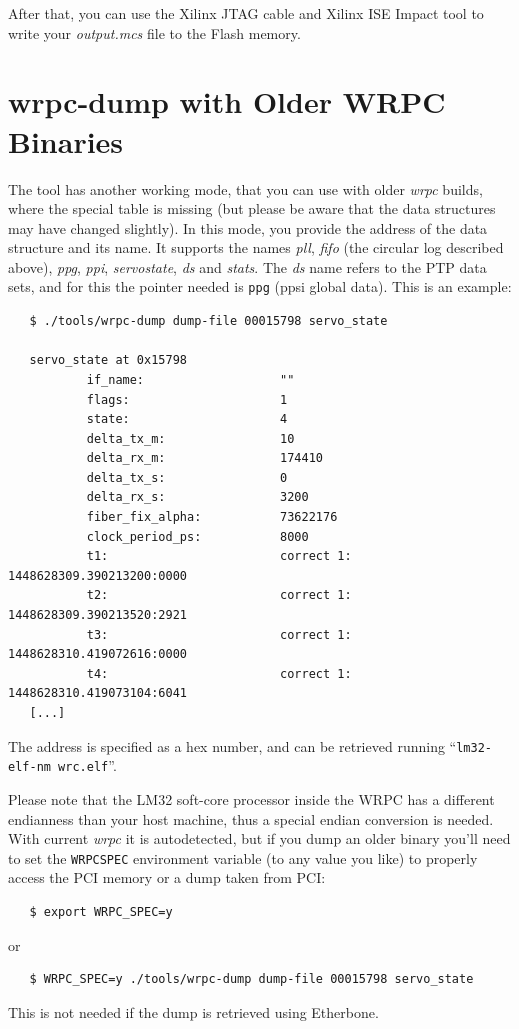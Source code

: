 \documentclass[a4paper, 12pt]{article}
\renewcommand{\_}{\underscore\allowbreak}
\begin{document}
After that, you can use the Xilinx JTAG cable and Xilinx ISE Impact tool to
write your \textit{output.mcs} file to the Flash memory.
\newpage
\section{wrpc-dump with Older WRPC Binaries}
\label{wrpc-dump with Older WRPC Binaries}

The tool has another working mode, that you can use with older
\textit{wrpc} builds, where the special table is missing (but please be
aware that the data structures may have changed slightly).  In this
mode, you provide the address of the data structure and its name. It
supports the names \textit{pll}, \textit{fifo} (the circular log described
above), \textit{ppg}, \textit{ppi}, \textit{servo\_state}, \textit{ds} and
\textit{stats}. The \textit{ds} name
refers to the PTP data sets, and for this the pointer needed is
\texttt{ppg} (ppsi global data).
This is an example:

\begin{lstlisting}
   $ ./tools/wrpc-dump dump-file 00015798 servo_state

   servo_state at 0x15798
           if_name:                   ""
           flags:                     1
           state:                     4
           delta_tx_m:                10
           delta_rx_m:                174410
           delta_tx_s:                0
           delta_rx_s:                3200
           fiber_fix_alpha:           73622176
           clock_period_ps:           8000
           t1:                        correct 1: 1448628309.390213200:0000
           t2:                        correct 1: 1448628309.390213520:2921
           t3:                        correct 1: 1448628310.419072616:0000
           t4:                        correct 1: 1448628310.419073104:6041
   [...]
\end{lstlisting}

The address is specified as a hex number, and can be retrieved running
``\texttt{lm32-elf-nm  wrc.elf}''.

Please note that the LM32 soft-core processor inside the WRPC has a different
endianness than your host machine, thus a special endian conversion is needed.
With current \textit{wrpc} it is autodetected, but if you dump an older binary
you'll need to set the
\texttt{WRPC\_SPEC} environment variable (to any value you like) to properly
access the PCI memory or a dump taken from PCI:
\begin{lstlisting}
   $ export WRPC_SPEC=y
\end{lstlisting}
or
\begin{lstlisting}
   $ WRPC_SPEC=y ./tools/wrpc-dump dump-file 00015798 servo_state
\end{lstlisting}
This is not needed if the dump is retrieved using Etherbone.
\end{document}
